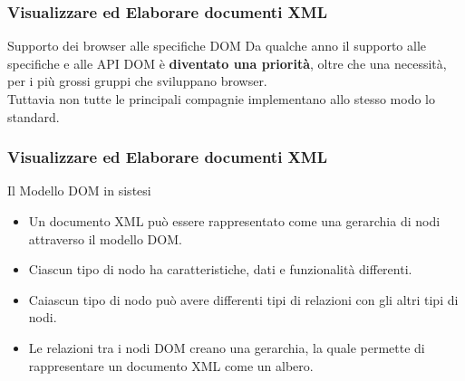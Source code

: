 \begin{frame}
    \frametitle{Visualizzare ed Elaborare documenti XML}
    \addtocounter{nframe}{1}
    

     \begin{block}{Supporto dei browser alle specifiche DOM}
        Da qualche anno il supporto alle specifiche e alle API DOM è \textbf{diventato una priorità}, oltre che una necessità, per i più grossi gruppi che sviluppano browser.
        \\ Tuttavia non tutte le principali compagnie implementano allo stesso modo lo standard.
     \end{block}
     
\end{frame}


\begin{frame}
    \frametitle{Visualizzare ed Elaborare documenti XML}
    \addtocounter{nframe}{1}
    
     \begin{block}{Il Modello DOM in sistesi}
        \begin{itemize}
            \item Un documento XML può essere rappresentato come una gerarchia di nodi attraverso il modello DOM.
            \item Ciascun tipo di nodo ha caratteristiche, dati e funzionalità differenti.
            \item Caiascun tipo di nodo può avere differenti tipi di relazioni con gli altri tipi di nodi.
            \item Le relazioni tra i nodi DOM creano una gerarchia, la quale permette di rappresentare un documento XML come un albero.
        \end{itemize}
     \end{block}
     
\end{frame}

